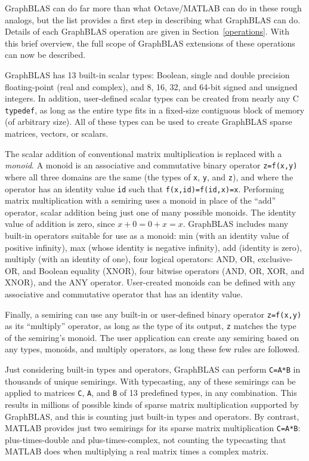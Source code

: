 \documentclass[12pt]{article}
\begin{document}
GraphBLAS can do far more than what Octave/MATLAB can do in these rough
analogs, but the list provides a first step in describing what GraphBLAS can
do.  Details of each GraphBLAS operation are given in Section~\ref{operations}.
With this brief overview, the full scope of GraphBLAS extensions of these
operations can now be described.

GraphBLAS has 13 built-in scalar types: Boolean, single and double precision
floating-point (real and complex), and 8, 16, 32, and 64-bit signed and
unsigned integers.  In addition, user-defined scalar types can be created from
nearly any C \verb'typedef', as long as the entire type fits in a fixed-size
contiguous block of memory (of arbitrary size).  All of these types can be used
to create GraphBLAS sparse matrices, vectors, or scalars.

The scalar addition of conventional matrix multiplication is replaced with a
{\em monoid}.  A monoid is an associative and commutative binary operator
\verb'z=f(x,y)' where all three domains are the same (the types of \verb'x',
\verb'y', and \verb'z'), and where the operator has an identity value \verb'id'
such that \verb'f(x,id)=f(id,x)=x'.  Performing matrix multiplication with a
semiring uses a monoid in place of the ``add'' operator, scalar addition being
just one of many possible monoids.  The identity value of addition is zero,
since $x+0=0+x=x$.   GraphBLAS includes many built-in operators suitable for
use as a monoid: min (with an identity value of positive infinity), max (whose
identity is negative infinity), add (identity is zero), multiply (with an
identity of one), four logical operators: AND, OR, exclusive-OR, and
Boolean equality (XNOR), four bitwise operators (AND, OR, XOR, and XNOR),
and the ANY operator.
User-created monoids can be defined with any associative and
commutative operator that has an identity value.

Finally, a semiring can use any built-in or user-defined binary operator
\verb'z=f(x,y)' as its ``multiply'' operator, as long as the type of its
output, \verb'z' matches the type of the semiring's monoid.
The user application can create any semiring based on any types, monoids,
and multiply operators, as long these few rules are followed.

Just considering built-in types and operators, GraphBLAS can perform
\verb'C=A*B' in thousands of unique semirings.  With typecasting, any of these
semirings can be applied to matrices \verb'C', \verb'A', and \verb'B' of 13
predefined types, in any combination.  This results in millions of possible
kinds of sparse matrix multiplication supported by GraphBLAS, and this is
counting just built-in types and operators.  By contrast, MATLAB provides just
two semirings for its sparse matrix multiplication \verb'C=A*B':
plus-times-double and plus-times-complex, not counting the typecasting that
MATLAB does when multiplying a real matrix times a complex matrix.
\end{document}
